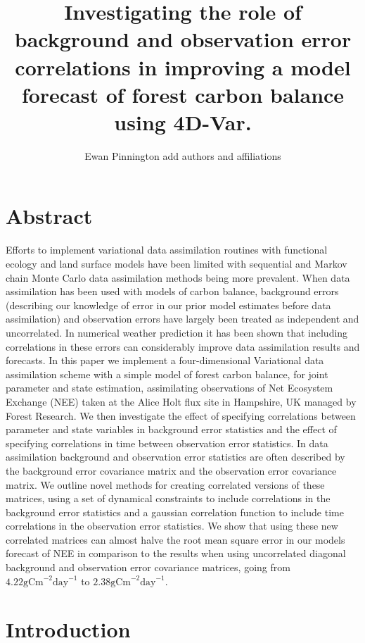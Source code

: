 \documentclass[11pt]{article}
\title{Investigating the role of background and observation error correlations in improving a model forecast of forest carbon balance using 4D-Var.}
\author{Ewan Pinnington {\color{red} add authors and affiliations}}
\begin{document}
\maketitle

\section*{Abstract}

Efforts to implement variational data assimilation routines with functional ecology and land surface models have been limited with sequential and Markov chain Monte Carlo data assimilation methods being more prevalent. When data assimilation has been used with models of carbon balance, background errors (describing our knowledge of error in our prior model estimates before data assimilation) and observation errors have largely been treated as independent and uncorrelated. In numerical weather prediction it has been shown that including correlations in these errors can considerably improve data assimilation results and forecasts. In this paper we implement a four-dimensional Variational data assimilation scheme with a simple model of forest carbon balance, for joint parameter and state estimation, assimilating observations of Net Ecosystem Exchange (NEE) taken at the Alice Holt flux site in Hampshire, UK managed by Forest Research. We then investigate the effect of specifying correlations between parameter and state variables in background error statistics and the effect of specifying correlations in time between observation error statistics. In data assimilation background and observation error statistics are often described by the background error covariance matrix and the observation error covariance matrix. We outline novel methods for creating correlated versions of these matrices, using a set of dynamical constraints to include correlations in the background error statistics and a gaussian correlation function to include time correlations in the observation error statistics. We show that using these new correlated matrices can almost halve the root mean square error in our models forecast of NEE in comparison to the results when using uncorrelated diagonal background and observation error covariance matrices, going from $4.22\text{gCm}^{-2}\text{day}^{-1}$ to $2.38\text{gCm}^{-2}\text{day}^{-1}$.      

\section{Introduction} \label{sec:intro}
\end{document}
